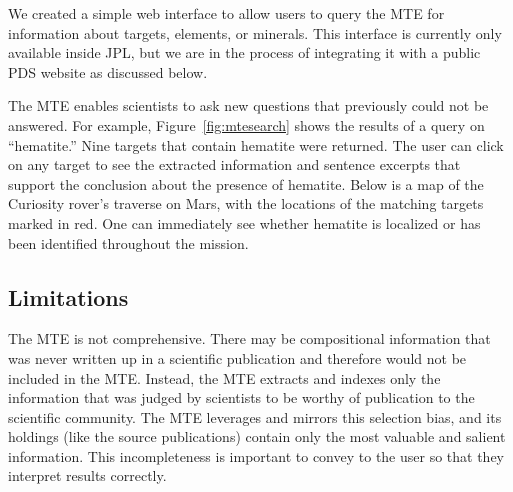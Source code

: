 \documentclass[letterpaper]{article} %
\begin{document}
We created a simple web interface to allow users to query the MTE for
information about targets, elements, or minerals.  This interface is
currently only available inside JPL, but we are in the process of
integrating it with a public PDS website as discussed below.

The MTE enables scientists to ask new questions that previously could
not be answered.  For example, Figure~\ref{fig:mtesearch} shows the
results of a query on ``hematite.''  Nine targets that contain
hematite were returned.  The user can click on any target to see the
extracted information and sentence excerpts that support the
conclusion about the presence of hematite.  Below is a map
of the Curiosity rover's traverse on Mars, with the locations of the
matching targets marked in red.  One can immediately see whether
hematite is localized or has been identified throughout the mission.

\subsection{Limitations}

The MTE is not comprehensive.  There may be compositional information
that was never written up in a scientific publication and therefore
would not be included in the MTE.  Instead, the MTE extracts and
indexes only the information that was judged by scientists to be
worthy of publication to the scientific community.  The MTE leverages
and mirrors this selection bias, and its holdings (like the source
publications) contain only the most valuable and salient information.
This incompleteness is important to convey to the user so that
they interpret results correctly.
\end{document}
